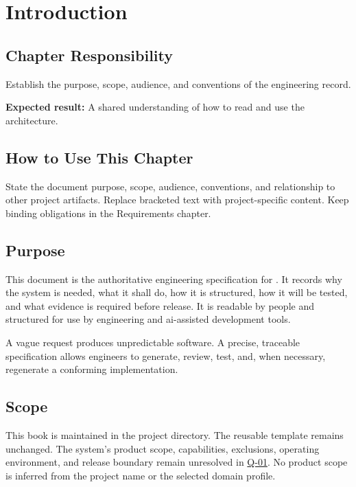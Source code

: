 \chapter{Introduction}

\section{Chapter Responsibility}
\label{Section:IntroductionResponsibility}
Establish the purpose, scope, audience, and conventions of the engineering record.

\noindent\textbf{Expected result:} A shared understanding of how to read and use the architecture.

\section{How to Use This Chapter}
State the document purpose, scope, audience, conventions, and relationship to
other project artifacts. Replace bracketed text with project-specific content.
Keep binding obligations in the Requirements chapter.

\section{Purpose}
This document is the authoritative engineering specification for
\ProjectName. It records why the system is needed, what it shall do, how it is
structured, how it will be tested, and what evidence is required before
release. It is readable by people and structured for use by engineering and
\gls{ai}-assisted development tools.

\begin{embswNote}
A vague request produces unpredictable software. A precise, traceable
specification allows engineers to generate, review, test, and, when necessary,
regenerate a conforming implementation.
\end{embswNote}

\section{Scope}
This book is maintained in the project directory.
The reusable template remains unchanged. The system's
product scope, capabilities, exclusions, operating environment, and release
boundary remain unresolved in \hyperref[Question:Q-01]{Q-01}. No product scope
is inferred from the project name or the selected domain profile.

